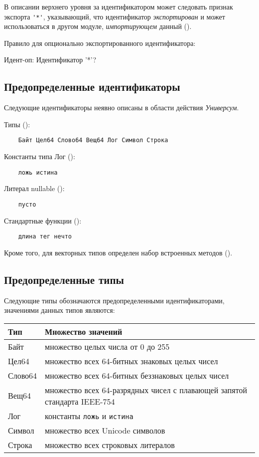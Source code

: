 В описании верхнего уровня за идентификатором может следовать признак экспорта \verb|'*'|, указывающий, что идентификатор \emph{экспортирован} и может использоваться в другом модуле, \emph{импортирующем} данный (). 

\bigskip
Правило для опционально экспортированного идентификатора:
\begin{Grammar}[vspace=2pt]
Идент-оп:  Идентификатор '*'?
\end{Grammar} 

\hypertarget{predefined-idents}{%
\subsection{Предопределенные идентификаторы}\label{decls:predefined-idents}}

Следующие идентификаторы неявно описаны в области действия \emph{Универсум}.
\bigskip

Типы ():
\begin{Verbatim}
    Байт Цел64 Слово64 Вещ64 Лог Символ Строка
\end{Verbatim}

Константы типа Лог ():
\begin{Verbatim}
    ложь истина
\end{Verbatim}

Литерал nullable ():
\begin{Verbatim}
    пусто
\end{Verbatim}

Стандартные функции ():
\begin{Verbatim}
    длина тег нечто
\end{Verbatim}

Кроме того, для векторных типов определен набор встроенных методов ().

\hypertarget{predefined-types}{%
\subsection{Предопределенные типы}\label{decls:predefined-types}}

Следующие типы обозначаются предопределенными идентификаторами, значениями данных типов являются:

\smallskip
\begin{tabular}[c]{l|l}
\textbf{Тип} & \textbf{Множество значений} \\ \hline
Байт &  множество целых числа от 0 до 255   \\
Цел64 & множество всех 64-битных знаковых целых чисел \\
Слово64 & множество всех 64-битных беззнаковых целых чисел  \\ 
Вещ64 & множество всех 64-разрядных чисел с плавающей запятой стандарта IEEE-754 \\ 
Лог & константы \verb|ложь| и \verb|истина| \\ 
Символ & множество всех Unicode символов \\ 
Строка & множество всех строковых литералов
\end{tabular}

